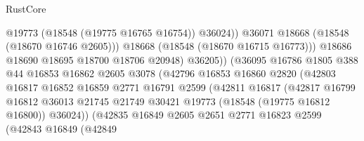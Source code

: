 \begin{lexlean}{RustCore}
\begin{coremodule}
                                            @19773
                                            (@18548 (@19775 @16765 @16754))
                                            @36024))
                                        @36071
                                        @18668
                                        (@18548 (@18670 @16746 @2605)))
                                      @18668
                                      (@18548 (@18670 @16715 @16773)))
                                    @18686
                                    @18690
                                    @18695
                                    @18700
                                    @18706
                                    @20948)
                                  @36205))
                              (@36095
                                @16786
                                @1805
                                @388
                                @44
                                @16853
                                @16862
                                @2605
                                @3078
                                (@42796
                                  @16853
                                  @16860
                                  @2820
                                  (@42803
                                    @16817
                                    @16852
                                    @16859
                                    @2771
                                    @16791
                                    @2599
                                    (@42811
                                      @16817
                                      (@42817
                                        @16799
                                        @16812
                                        @36013
                                        @21745
                                        @21749
                                        @30421
                                        @19773
                                        (@18548 (@19775 @16812 @16800))
                                        @36024))
                                    (@42835
                                      @16849
                                      @2605
                                      @2651
                                      @2771
                                      @16823
                                      @2599
                                      (@42843
                                        @16849
                                        (@42849

\end{coremodule}
\end{lexlean}
